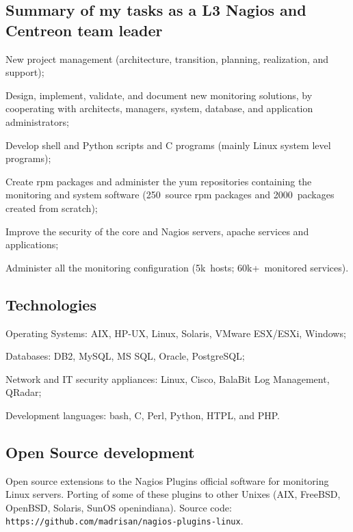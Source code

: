 \subsection{Summary of my tasks as a L3 Nagios and Centreon team leader}

\item{\bdot} New project management (architecture, transition, planning, 
   realization, and support);
\item{\bdot} Design, implement, validate, and document new monitoring solutions,
   by cooperating with architects, managers, system, database, and application 
   administrators;
\item{\bdot} Develop shell and Python scripts and C programs 
   (mainly Linux system level programs);
\item{\bdot} Create rpm packages and administer the yum repositories containing
   the monitoring and system software (250\smallplus~source rpm packages and
   2000~packages created from scratch);
\item{\bdot} Improve the security of the core and Nagios servers, apache 
   services and applications;
\item{\bdot} Administer all the monitoring configuration
   (5k\smallplus~hosts; 60k+~monitored services).

\subsection{Technologies}

\item{\bdot} Operating Systems: AIX, HP-UX, Linux, Solaris, VMware ESX/ESXi, Windows;
\item{\bdot} Databases: DB2, MySQL, MS SQL, Oracle, PostgreSQL;
\item{\bdot} Network and IT security appliances: Linux, Cisco, BalaBit Log Management, 
   QRadar;
\item{\bdot} Development languages: bash, C, Perl, Python, HTPL, and PHP.

\subsection{Open Source development}

Open source extensions to the Nagios Plugins official software for monitoring
Linux servers.
Porting of some of these plugins to other Unixes
(AIX, FreeBSD, OpenBSD, Solaris, SunOS openindiana).
Source code:
{\tt https://github.com/madrisan/nagios-plugins-linux}.

